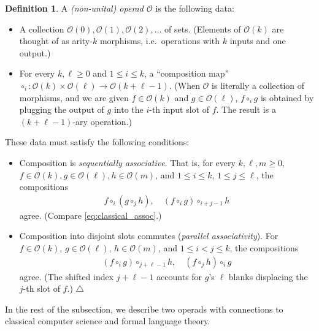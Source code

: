 \documentclass{article}
\theoremstyle{plain}
\theoremstyle{definition}
\newtheorem{definition}[theorem]{Definition}
\theoremstyle{remark}
\theoremstyle{definition}
\newcommand\cO{\mathcal{O}}
\begin{document}
\begin{definition}
\label{def:operad}
A \emph{(non-unital) operad $\cO$} is the following data:
\begin{itemize}
\item A collection $\cO(0), \cO(1), \cO(2), \ldots$ of sets.
(Elements of $\cO(k)$ are thought of as arity-$k$ morphisms, i.e.\ operations with $k$ inputs and one output.)

\item For every $k, \ell \geq 0$ and $1 \leq i \leq k$, a ``composition map'' $\circ_i\colon \cO(k) \times \cO(\ell) \to \cO(k+\ell-1)$.
(When $\cO$ is literally a collection of morphisms, and we are given $f \in \cO(k)$ and $g \in \cO(\ell)$, $f \circ_i g$ is obtained by plugging the output of $g$ into the $i$-th input slot of $f$.
The result is a $(k+\ell-1)$-ary operation.)
\end{itemize}
These data must satisfy the following conditions:
\begin{itemize}
\item
Composition is \emph{sequentially associative}.
That is, for every $k, \ell, m \geq 0$, $f \in \cO(k), g\in\cO(\ell), h\in\cO(m)$, and $1 \leq i \leq k$, $1 \leq j \leq \ell$, the compositions
\begin{align}
f \circ_i (g \circ_j h),
\quad
(f \circ_i g) \circ_{i+j-1} h
\end{align}
agree.
(Compare \eqref{eq:classical_assoc}.)

\item
Composition into disjoint slots commutes (\emph{parallel associativity}).
For $f \in \cO(k)$, $g \in \cO(\ell)$, $h \in \cO(m)$, and $1 \leq i < j \leq k$, the compositions
\begin{align}
(f \circ_i g) \circ_{j+\ell-1} h,
\quad
(f \circ_j h) \circ_i g
\end{align}
agree.
(The shifted index $j+\ell-1$ accounts for $g$'s $\ell$ blanks displacing the $j$-th slot of $f$.)
\null\hfill$\triangle$
\end{itemize}
\end{definition}

In the rest of the subsection, we describe two operads with connections to classical computer science and formal language theory.
\end{document}
